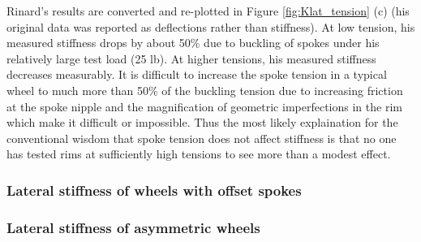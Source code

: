 \documentclass[\rootdir/thesis.tex]{subfiles}
\begin{document}
Rinard's results are converted and re-plotted in Figure \ref{fig:Klat_tension} (c) (his original data was reported as deflections rather than stiffness). At low tension, his measured stiffness drops by about 50\% due to buckling of spokes under his relatively large test load (25 lb). At higher tensions, his measured stiffness decreases measurably. It is difficult to increase the spoke tension in a typical wheel to much more than 50\% of the buckling tension due to increasing friction at the spoke nipple and the magnification of geometric imperfections in the rim which make it difficult or impossible. Thus the most likely explaination for the conventional wisdom that spoke tension does not affect stiffness is that no one has tested rims at sufficiently high tensions to see more than a modest effect.


\subsubsection{Lateral stiffness of wheels with offset spokes}

\subsubsection{Lateral stiffness of asymmetric wheels}


\end{document}
